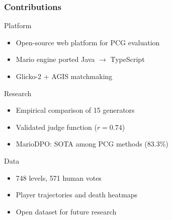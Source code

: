 \documentclass{beamer}
\begin{document}
\begin{frame}
\frametitle{Contributions}

\begin{block}{Platform}
\begin{itemize}
    \item Open-source web platform for PCG evaluation
    \item Mario engine ported Java $\rightarrow$ TypeScript
    \item Glicko-2 + AGIS matchmaking
\end{itemize}
\end{block}

\begin{block}{Research}
\begin{itemize}
    \item Empirical comparison of 15 generators
    \item Validated judge function ($r = 0.74$)
    \item MarioDPO: SOTA among PCG methods (83.3\%)
\end{itemize}
\end{block}

\begin{block}{Data}
\begin{itemize}
    \item 748 levels, 571 human votes
    \item Player trajectories and death heatmaps
    \item Open dataset for future research
\end{itemize}
\end{block}

\end{frame}
\end{document}
